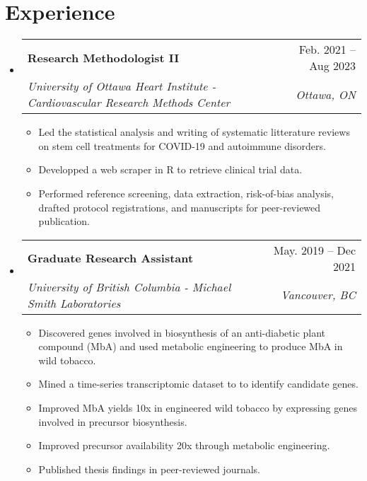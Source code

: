 \documentclass[letterpaper,11pt]{article}
\makeatletter
\newcommand{\resumeItem}[1]{
  \item\small{
    {#1 \vspace{-2pt}}
  }
}
\newcommand{\resumeSubheading}[4]{
  \vspace{-2pt}\item
    \begin{tabular*}{0.97\textwidth}[t]{l@{\extracolsep{\fill}}r}
      \textbf{#1} & #2 \\
      \textit{\small#3} & \textit{\small #4} \\
    \end{tabular*}\vspace{-7pt}
}
\newcommand{\resumeSubSubheading}[2]{
    \item
    \begin{tabular*}{0.97\textwidth}{l@{\extracolsep{\fill}}r}
      \textit{\small#1} & \textit{\small #2} \\
    \end{tabular*}\vspace{-7pt}
}
\newcommand{\resumeSubHeadingListStart}{\begin{itemize}[leftmargin=0.15in, label={}]}
\newcommand{\resumeSubHeadingListEnd}{\end{itemize}}
\newcommand{\resumeItemListStart}{\begin{itemize}}
\newcommand{\resumeItemListEnd}{\end{itemize}\vspace{-5pt}}
\makeatother
\begin{document}
\section{Experience}
  \resumeSubHeadingListStart
  
    \resumeSubheading
      {Research Methodologist II}{Feb. 2021 -- Aug 2023}
      {University of Ottawa Heart Institute - Cardiovascular Research Methods Center}{Ottawa, ON}
      \resumeItemListStart
        \resumeItem{Led the statistical analysis and writing of systematic litterature reviews on stem cell treatments for COVID-19 and autoimmune disorders.}
        \resumeItem{Developped a web scraper in R to retrieve clinical trial data.}
        \resumeItem{Performed reference screening, data extraction, risk-of-bias analysis, drafted protocol registrations, and manuscripts for peer-reviewed publication.}
    \resumeItemListEnd
    
    \resumeSubheading
      {Graduate Research Assistant}{May. 2019 -- Dec 2021}
      {University of British Columbia - Michael Smith Laboratories }{Vancouver, BC}
      \resumeItemListStart
        \resumeItem{Discovered genes involved in biosynthesis of an anti-diabetic plant compound (MbA) and used metabolic engineering to produce MbA in wild tobacco.}
        \resumeItem{Mined a time-series transcriptomic dataset to to identify candidate genes.}
        \resumeItem{Improved MbA yields 10x in engineered wild tobacco by expressing genes involved in precursor biosynthesis.}
        \resumeItem{Improved precursor availability 20x through metabolic engineering.}
        \resumeItem{Published thesis findings in peer-reviewed journals.}
      \resumeItemListEnd
      



  \resumeSubHeadingListEnd

  
\end{document}
